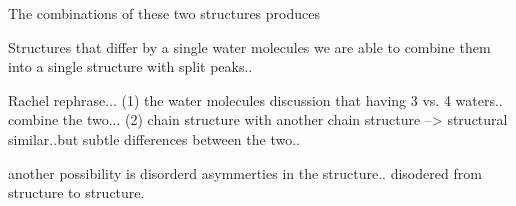 



The combinations of these two structures produces 

Structures that differ by a single water molecules we are able to combine them into a single structure with split peaks..

Rachel rephrase... 
(1) the water molecules discussion that having 3 vs. 4 waters.. combine the two... 
(2) chain structure with another chain structure --> structural similar..but subtle differences between the two.. 

another possibility is disorderd asymmerties in the structure.. disodered from structure to structure. 
